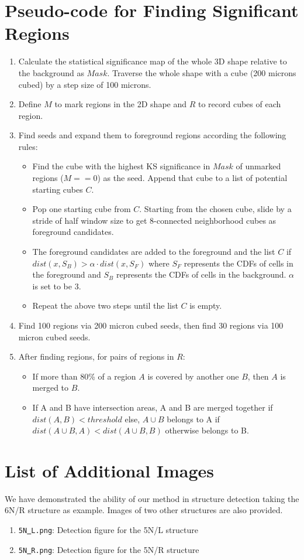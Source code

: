 \documentclass[runningheads]{llncs}
\begin{document}
\section{Pseudo-code for Finding Significant Regions}
\begin{enumerate}
  \item Calculate the statistical significance map of the whole 3D shape relative to the background as $Mask$. Traverse the whole shape with a cube (200 microns cubed) by a step size of 100 microns.
  \item Define $M$ to mark regions in the 2D shape and $R$ to record cubes of each region.
  \item Find seeds and expand them to foreground regions according the following rules:
  		\begin{itemize}
			 \item Find the cube with the highest KS significance in $Mask$ of unmarked regions ($M==0$) as the seed. Append that cube to a list of potential starting cubes $C$.
			 \item Pop one starting cube from $C$. Starting from the chosen cube, slide by a stride of half window size to get 8-connected neighborhood cubes as foreground candidates.
 			 \item The foreground candidates are added to the foreground and the list $C$ if $dist(x,S_B )>\alpha \cdot dist(x,S_F)$ where $S_F$ represents the CDFs of cells in the foreground and $S_B$ represents the CDFs of cells in the background. $\alpha$ is set to be 3.
			 \item Repeat the above two steps until the list $C$ is empty.
		\end{itemize}
  \item Find 100 regions via 200 micron cubed seeds, then find 30 regions via 100 micron cubed seeds.
  \item After finding regions, for pairs of regions in $R$:
 		 \begin{itemize}
			 \item If more than 80\% of a region $A$ is covered by another one $B$, then $A$ is merged to $B$.
			 \item If A and B have intersection areas, A and B are merged together if $dist(A,B)<threshold $ else, $A\cup B$ belongs to A if $dist(A\cup B,A)<dist(A\cup B,B)$ otherwise belongs to B.
		\end{itemize}
\end{enumerate}

\section{List of Additional Images}
We have demonstrated the ability of our method in structure detection taking the 6N/R structure as example. Images of two other structures are also provided.
\begin{enumerate}
\item \texttt{5N\underline{{ }}L.png}: Detection figure for the 5N/L structure
\item \texttt{5N\underline{{ }}R.png}: Detection figure for the 5N/R structure
\end{enumerate}

\fi
\end{document}
